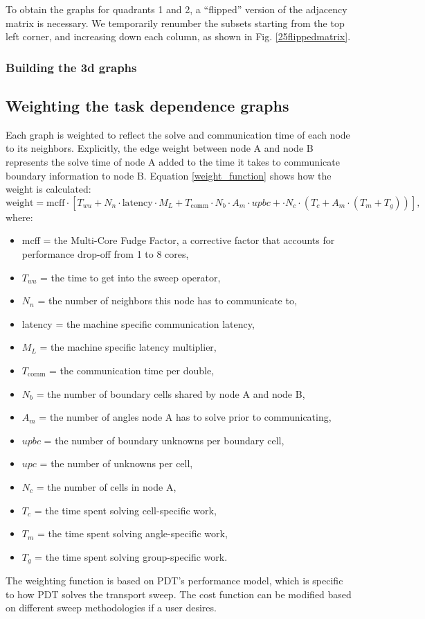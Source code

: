 To obtain the graphs for quadrants 1 and 2, a ``flipped'' version of the adjacency matrix is necessary. We temporarily renumber the subsets starting from the top left corner, and increasing down each column, as shown in Fig. \ref{25flippedmatrix}.

\subsubsection{Building the 3d graphs}


\subsection{Weighting the task dependence graphs}

Each graph is weighted to reflect the solve and communication time of each node to its neighbors. Explicitly, the edge weight between node A and node B represents the solve time of node A added to the time it takes to communicate boundary information to node B. Equation \ref{weight_function} shows how the weight is calculated:
\begin{equation}
\text{weight} = \text{mcff}\cdot [T_{wu} + N_n\cdot \text{latency}\cdot M_L + T_{\text{comm}}\cdot N_b\cdot A_m\cdot upbc + \cdot N_c\cdot (T_c + A_m\cdot (T_m + T_g))],
\label{weight_function}
\end{equation}
where:
\begin{itemize}
  \item mcff = the Multi-Core Fudge Factor, a corrective factor that accounts for performance drop-off from 1 to 8 cores,
  \item $T_{wu}$ = the time to get into the sweep operator,
  \item $N_n$ = the number of neighbors this node has to communicate to,
  \item latency = the machine specific communication latency,
  \item $M_L$ = the machine specific latency multiplier,
  \item $T_{\text{comm}}$ = the communication time per double,
  \item $N_b$ = the number of boundary cells shared by node A and node B,
  \item $A_m$ = the number of angles node A has to solve prior to communicating,
  \item $upbc$ = the number of boundary unknowns per boundary cell,
  \item $upc$ = the number of unknowns per cell,
  \item $N_c$ = the number of cells in node A,
  \item $T_c$ = the time spent solving cell-specific work,
  \item $T_m$ = the time spent solving angle-specific work,
  \item $T_g$ = the time spent solving group-specific work.
\end{itemize}
The weighting function is based on PDT's performance model\cite{mpadams15}, which is specific to how PDT solves the transport sweep. The cost function can be modified based on different sweep methodologies if a user desires.


